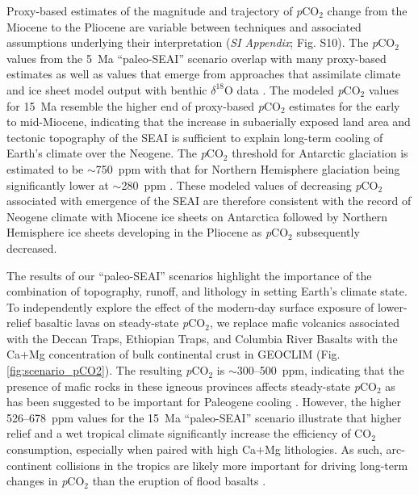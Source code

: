 \documentclass[9pt,twocolumn,twoside,lineno]{pnas-new}
\newcommand{\dO}{$\delta^{18}$O\xspace}
\newcommand{\pCOtwo}{\textit{p}CO$_{2}$\xspace}
\newcommand{\COtwo}{CO$_{2}$\xspace}
\newcommand{\SI}{\textit{SI Appendix}\xspace}
\begin{document}
Proxy-based estimates of the magnitude and trajectory of \pCOtwo change from the Miocene to the Pliocene are variable between techniques and associated assumptions underlying their interpretation (\SI; Fig. S10). The \pCOtwo values from the 5~Ma ``paleo-SEAI'' scenario overlap with many proxy-based estimates \cite{Foster2017a} as well as values that emerge from approaches that assimilate climate and ice sheet model output with benthic \dO data \cite{van-de-Wal2011a, Berends2020a}. The modeled \pCOtwo values for 15~Ma resemble the higher end of proxy-based \pCOtwo estimates for the early to mid-Miocene, indicating that the increase in subaerially exposed land area and tectonic topography of the SEAI is sufficient to explain long-term cooling of Earth's climate over the Neogene. The \pCOtwo threshold for Antarctic glaciation is estimated to be $\sim$750~ppm with that for Northern Hemisphere glaciation being significantly lower at $\sim$280~ppm \cite{DeConto2008a}. These modeled values of decreasing \pCOtwo associated with emergence of the SEAI are therefore consistent with the record of Neogene climate with Miocene ice sheets on Antarctica \cite{Sugden1995a} followed by Northern Hemisphere ice sheets developing in the Pliocene \cite{Haug2005a} as \pCOtwo subsequently decreased.

The results of our ``paleo-SEAI'' scenarios highlight the importance of the combination of topography, runoff, and lithology in setting Earth's climate state. To independently explore the effect of the modern-day surface exposure of lower-relief basaltic lavas on steady-state \pCOtwo \cite{Kent2013a}, we replace mafic volcanics associated with the Deccan Traps, Ethiopian Traps, and Columbia River Basalts with the Ca+Mg concentration of bulk continental crust in GEOCLIM (Fig. \ref{fig:scenario_pCO2}). The resulting \pCOtwo is $\sim$300--500~ppm, indicating that the presence of mafic rocks in these igneous provinces affects steady-state \pCOtwo as has been suggested to be important for Paleogene cooling \cite{Kent2013a}. However, the higher 526--678~ppm values for the 15~Ma ``paleo-SEAI'' scenario illustrate that higher relief and a wet tropical climate significantly increase the efficiency of \COtwo consumption, especially when paired with high Ca+Mg lithologies. As such, arc-continent collisions in the tropics are likely more important for driving long-term changes in \pCOtwo than the eruption of flood basalts \cite{Macdonald2019a, Park2019a}.
\end{document}
